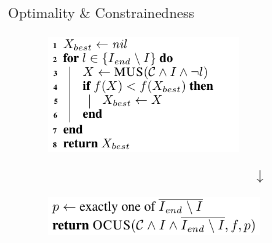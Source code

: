 \documentclass[handout]{beamer}
\begin{document}
\begin{frame}{Optimality \& Constrainedness}
	\begin{figure}
		\includegraphics[width=0.45\textwidth]{algo_mus2.png}
	\end{figure}\pause
	{\Huge$$\downarrow$$}
	\begin{figure}
		\includegraphics[width=0.5\textwidth]{exactly_one.png}
	\end{figure}
\end{frame}
\end{document}
